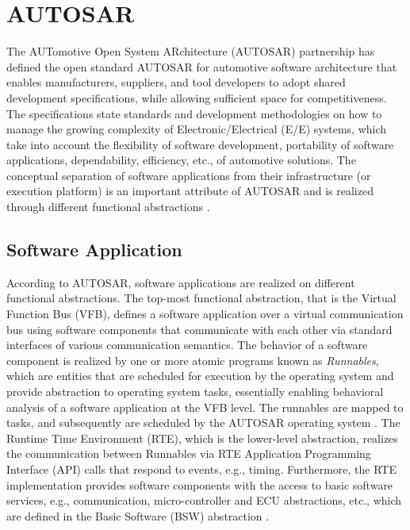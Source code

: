 \section{AUTOSAR}\label{sec_autosar}
The AUTomotive Open System ARchitecture (AUTOSAR) partnership has defined the open standard AUTOSAR for automotive software architecture that enables manufacturers, suppliers, and tool developers to adopt shared development specifications, while allowing sufficient space for competitiveness. The specifications state standards and development methodologies on how to manage the growing complexity of Electronic/Electrical (E/E) systems, which take into account the flexibility of software development, portability of software applications, dependability, efficiency, etc., of automotive solutions. The conceptual separation of software applications from their infrastructure (or execution platform) is an important attribute of AUTOSAR and is realized through different functional abstractions \cite{NaumannAUTOSARBus}. 

\subsection{Software Application}
According to AUTOSAR, software applications are realized on different functional abstractions. The top-most functional abstraction, that is the Virtual Function Bus (VFB), defines a software application over a virtual communication bus using software components that communicate with each other via standard interfaces of various communication semantics. The behavior of a software component is realized by one or more atomic programs known as \textit{Runnables}, which are entities that are scheduled for execution by the operating system and provide abstraction to operating system tasks, essentially enabling behavioral analysis of a software application at the VFB level. The runnables are mapped to tasks, and subsequently are scheduled by the AUTOSAR operating system \cite{AUTOSAR2018Specification4.2.2}. The Runtime Time Environment (RTE), which is the lower-level abstraction, realizes the communication between Runnables via RTE Application Programming Interface (API) calls that respond to events, e.g., timing. Furthermore, the RTE implementation provides software components with the access to basic software services, e.g., communication, micro-controller and ECU abstractions, etc., which are defined in the Basic Software (BSW) abstraction \cite{NaumannAUTOSARBus}.
